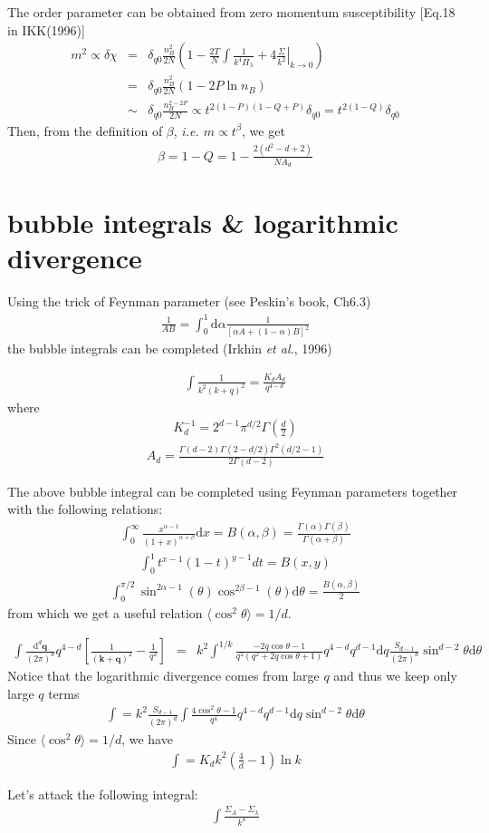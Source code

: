 \documentclass[aps,notitlepage]{revtex4-1}
\newcommand{\bea}{\begin{eqnarray}}
\newcommand{\eea}{\end{eqnarray}}
\newcommand{\bq}{\mathbf{q}}
\newcommand{\bk}{\mathbf{k}}
\newcommand{\md}{\mathrm{d}}
\newcommand{\ie}{\textit{i.e.{ }}}
\begin{document}
\begin{appendix}
The order parameter can be obtained from zero momentum susceptibility [Eq.18 in IKK(1996)]
\bea m^2\propto\delta\chi&=&\delta_{q0}\frac{n_B^2}{2N}\left( 1-\frac{2T}{N}\int \frac{1}{k^4\Pi_\lambda} + 4\left.\frac{\Sigma}{k^2}\right|_{k\rightarrow0} \right) \\
&=&\delta_{q0}\frac{n_B^2}{2N}\left(1-2P\ln n_B\right) \\
&\sim&\delta_{q0}\frac{n_B^{2-2P}}{2N}\propto t^{2(1-P)(1-Q+P)}\delta_{q0}=t^{2(1-Q)}\delta_{q0} \eea
Then, from the definition of $\beta$, \ie $m\propto t^{\beta}$, we get
\bea \beta=1-Q=1-\frac{2(d^2-d+2)}{NA_d} \eea 




\section{bubble integrals \& logarithmic divergence}
Using the trick of Feynman parameter (see Peskin's book, Ch6.3)
\bea \frac{1}{AB}=\int_0^1 \md \alpha \frac{1}{[\alpha A+(1-\alpha)B]^2} \eea
the bubble integrals can be completed (Irkhin {\it et al.}, 1996)

\bea \int \frac{1}{k^2(k+q)^2} = \frac{K_d A_d}{q^{4-d}} \eea
where 
\bea K_d^{-1}=2^{d-1}\pi^{d/2}\Gamma\left(\frac{d}{2}\right) \eea
\bea A_d=\frac{\Gamma(d-2)\Gamma(2-d/2)\Gamma^2(d/2-1)}{2\Gamma(d-2)} \eea



The above bubble integral can be completed using Feynman parameters together with the following relations:
\bea \int_0^\infty \frac{x^{\alpha-1}}{(1+x)^{\alpha+\beta}}\md x=B(\alpha,\beta)=\frac{\Gamma(\alpha)\Gamma(\beta)}{\Gamma(\alpha+\beta)} \eea 
\bea \int_0^1 t^{x-1}(1-t)^{y-1}dt = B(x,y) \eea 
\bea \int_0^{\pi/2} \sin^{2\alpha-1}(\theta)\cos^{2\beta-1}(\theta)\md \theta=\frac{B(\alpha,\beta)}{2} \eea
from which we get a useful relation $\langle \cos^2\theta \rangle=1/d$. 


\bea \int \frac{\md^d\bq}{(2\pi)^d} q^{4-d}\left[ \frac{1}{(\bk+\bq)^2}-\frac{1}{q^2} \right]
&=& k^2\int^{1/k}\frac{-2q\cos\theta-1}{q^2(q^2+2q\cos\theta+1)}q^{4-d} q^{d-1}\md q \frac{S_{d-1}}{(2\pi)^d} \sin^{d-2}\theta \md\theta \eea
Notice that the logarithmic divergence comes from large $q$ and thus we keep only large $q$ terms
\bea \int = k^2\frac{S_{d-1}}{(2\pi)^d} \int \frac{4\cos^2\theta-1}{q^4}q^{4-d}q^{d-1}\md q \sin^{d-2}\theta \md \theta \eea
Since $\langle \cos^2\theta\rangle=1/d$, we have
\bea \int = K_d k^2\left(\frac{4}{d}-1\right)\ln k \eea 


Let's attack the following integral:
\bea \int \frac{\Sigma_A-\Sigma_\lambda}{k^4} \eea 


\end{appendix}
\end{document}
